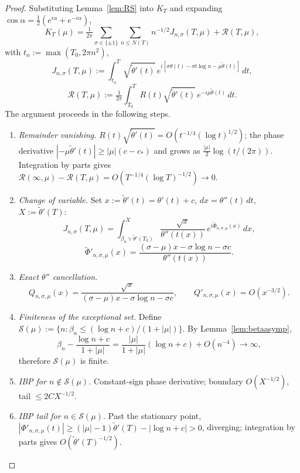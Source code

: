 \documentclass[11pt]{article}
\begin{document}
\begin{proof}
Substituting Lemma~\ref{lem:RS} into $K_T$ and expanding $\cos\alpha=\tfrac{1}{2}(e^{i\alpha}+e^{-i\alpha})$,
\[
K_T(\mu)=\tfrac{1}{2\pi}\sum_{\sigma\in\{\pm 1\}}\sum_{n\le N(T)}n^{-1/2}J_{n,\sigma}(T,\mu)+\mathcal{R}(T,\mu),
\]
with $t_n:=\max(T_0,2\pi n^2)$,
\[
J_{n,\sigma}(T,\mu):=\int_{t_n}^{T}\sqrt{\tilde\theta'(t)}\,e^{i[\sigma\theta(t)-\sigma t\log n-\mu\tilde\theta(t)]}\,dt,
\]
\[
\mathcal{R}(T,\mu):=\tfrac{1}{2\pi}\int_{T_0}^{T}R(t)\sqrt{\tilde\theta'(t)}\,e^{-i\mu\tilde\theta(t)}\,dt.
\]
The argument proceeds in the following steps.

\begin{enumerate}[label=(\roman*),leftmargin=*]

\item \emph{Remainder vanishing.} $R(t)\sqrt{\tilde\theta'(t)}=O(t^{-1/4}(\log t)^{1/2})$; the phase derivative $|-\mu\tilde\theta'(t)|\ge|\mu|(c-c_*)$ and grows as $\tfrac{|\mu|}{2}\log(t/(2\pi))$. Integration by parts gives $\mathcal{R}(\infty,\mu)-\mathcal{R}(T,\mu)=O(T^{-1/4}(\log T)^{-1/2})\to 0$.

\item \emph{Change of variable.} Set $x:=\tilde\theta'(t)=\theta'(t)+c$, $dx=\theta''(t)\,dt$, $X:=\tilde\theta'(T)$:
\[
J_{n,\sigma}(T,\mu)=\int_{\beta_n\vee\tilde\theta'(T_0)}^{X}\frac{\sqrt{x}}{\theta''(t(x))}\,e^{i\widetilde\Phi_{n,\sigma,\mu}(x)}\,dx,
\]
\[
\widetilde\Phi'_{n,\sigma,\mu}(x)=\frac{(\sigma-\mu)x-\sigma\log n-\sigma c}{\theta''(t(x))}.
\]

\item \emph{Exact $\theta''$ cancellation.}
\[
Q_{n,\sigma,\mu}(x)=\frac{\sqrt{x}}{(\sigma-\mu)x-\sigma\log n-\sigma c},\qquad Q'_{n,\sigma,\mu}(x)=O(x^{-3/2}).
\]

\item \emph{Finiteness of the exceptional set.} Define $\mathcal{S}(\mu):=\{n:\beta_n\le(\log n+c)/(1+|\mu|)\}$. By Lemma~\ref{lem:betaasymp},
\[
\beta_n-\frac{\log n+c}{1+|\mu|}=\frac{|\mu|}{1+|\mu|}(\log n+c)+O(n^{-4})\to\infty,
\]
therefore $\mathcal{S}(\mu)$ is finite.

\item \emph{IBP for $n\notin\mathcal{S}(\mu)$.} Constant-sign phase derivative; boundary $O(X^{-1/2})$, tail $\le 2CX^{-1/2}$.

\item \emph{IBP tail for $n\in\mathcal{S}(\mu)$.} Past the stationary point, $|\Phi'_{n,\sigma,\mu}(t)|\ge(|\mu|-1)\tilde\theta'(T)-|\log n+c|>0$, diverging; integration by parts gives $O(\tilde\theta'(T)^{-1/2})$.


\end{enumerate}
\end{proof}
\end{document}
